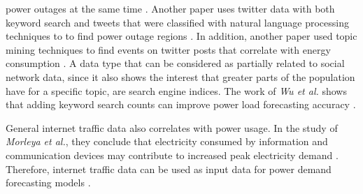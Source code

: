 power outages at the same time \cite{poweroutagetwitter}.
Another paper uses twitter data with both keyword search and 
tweets that were classified with natural language processing techniques to
to find power outage regions \cite{twitterpoweroutagelighttime}.
In addition, another paper used topic mining techniques to find
events on twitter posts that correlate with energy consumption 
\cite{twittertopicevent}.
A data type that can be considered as partially related to social 
network data, since it also shows the interest that greater parts of 
the population have for a specific topic, are search engine indices.
The work of \textit{Wu et al.} shows that adding keyword search counts
can improve power load forecasting accuracy \cite{googlepowerforecast}.

General internet traffic data also correlates with power usage.
In the study of \textit{Morleya et al.}, they conclude that 
electricity consumed by information and communication devices
may contribute to increased peak electricity demand 
\cite{internettrafficenergycorrelation}.
Therefore, internet traffic data can be used as input data for 
power demand forecasting models \cite{electricityinternetforecast}. 


